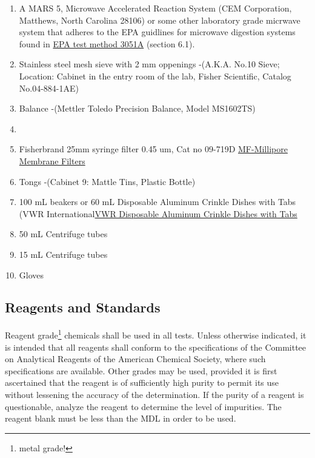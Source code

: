 \documentclass[12pt]{../SOP3_alpha}\usepackage[]{graphicx}\usepackage[]{color}
\begin{document}
\begin{enumerate}
  \item A MARS 5, Microwave Accelerated Reaction System (CEM Corporation, Matthews, North Carolina 28106) or some other laboratory grade micrwave system that adheres to the EPA guidlines for microwave digestion systems found in \href{https://www.google.com/url?sa=t&rct=j&q=&esrc=s&source=web&cd=1&cad=rja&uact=8&ved=0ahUKEwjNmefY3tfWAhVP92MKHatgCaQQFggqMAA&url=https%3A%2F%2Fwww.epa.gov%2Fsites%2Fproduction%2Ffiles%2F2015-12%2Fdocuments%2F3051a.pdf&usg=AOvVaw1LPlngQyM_L4Zu4SC-sATE}{EPA test method 3051A} (section 6.1). 
  \item Stainless steel mesh sieve with 2 mm oppenings -(A.K.A. No.10 Sieve; Location: Cabinet in the entry room of the lab, Fisher Scientific, Catalog No.04-884-1AE) 
  \item Balance -(Mettler Toledo Precision Balance, Model MS1602TS)
  \item 
  \item Fisherbrand 25mm syringe filter 0.45 um, Cat no 09-719D \href{https://www.emdmillipore.com/US/en/product/MF-Millipore%E2%84%A2-Membrane-Filters,MM_NF-C152}{MF-Millipore Membrane Filters}
  \item Tongs -(Cabinet 9: Mattle Tins, Plastic Bottle)
  
  \item 100 mL beakers or 60 mL Disposable Aluminum Crinkle Dishes with Tabs (VWR International\href{https://us.vwr.com/store/catalog/product.jsp?product_id=4622693}{VWR Disposable Aluminum Crinkle Dishes with Tabs}
  \item 50 mL Centrifuge tubes
  \item 15 mL Centrifuge tubes
  \item Gloves
\end{enumerate}

\subsection{Reagents and Standards}

\NP Reagent grade\footnote{metal grade!} chemicals shall be used in all tests. Unless otherwise indicated, it is
intended that all reagents shall conform to the specifications of the Committee on Analytical Reagents of the American Chemical Society, where such specifications are available. Other grades may be used, provided it is first ascertained that the reagent is of sufficiently high purity to permit its use without lessening the accuracy of the determination. If the purity of a reagent is questionable, analyze the reagent to determine the level of impurities. The reagent blank must be less than the MDL in order to be used. 
\end{document}
